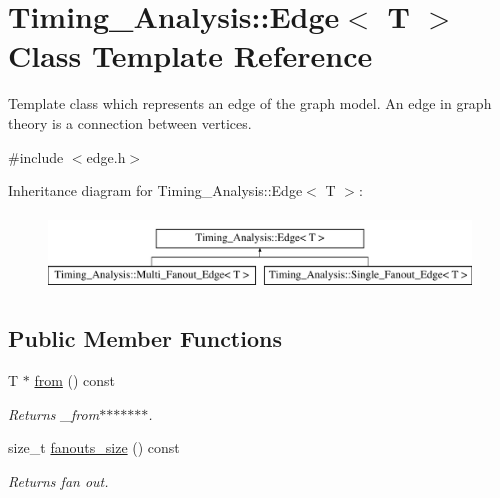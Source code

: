 \hypertarget{classTiming__Analysis_1_1Edge}{\section{Timing\-\_\-\-Analysis\-:\-:Edge$<$ T $>$ Class Template Reference}
\label{classTiming__Analysis_1_1Edge}
}


Template class which represents an edge of the graph model. An edge in graph theory is a connection between vertices.  




{\ttfamily \#include $<$edge.\-h$>$}

Inheritance diagram for Timing\-\_\-\-Analysis\-:\-:Edge$<$ T $>$\-:\begin{figure}[H]
\begin{center}
\leavevmode
\includegraphics[height=2.000000cm]{classTiming__Analysis_1_1Edge}
\end{center}
\end{figure}
\subsection*{Public Member Functions}
\begin{DoxyCompactItemize}
\item 
T $\ast$ \hyperlink{classTiming__Analysis_1_1Edge_a47020ea89fd9fde438adc814a731a23d}{from} () const 
\begin{DoxyCompactList}\small\item\em Returns \-\_\-from$\ast$$\ast$$\ast$$\ast$$\ast$$\ast$$\ast$. \end{DoxyCompactList}\item 
size\-\_\-t \hyperlink{classTiming__Analysis_1_1Edge_a60c70172e973450774a8ec5d4dadbcb5}{fanouts\-\_\-size} () const 
\begin{DoxyCompactList}\small\item\em Returns fan out. \end{DoxyCompactList}\end{DoxyCompactItemize}
